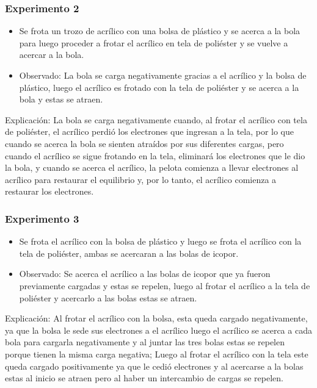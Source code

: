 \documentclass[letterpaper, 12pt]{report}
\begin{document}
\subsubsection{Experimento 2}

\begin{itemize}
	\item Se frota un  trozo de acrílico con una bolsa de plástico y se
	      acerca a la bola  para luego proceder a frotar el acrílico en tela de
	      poliéster y se vuelve a acercar a la bola.

	\item Observado: La bola se carga negativamente gracias a el acrílico
	      y la bolsa de plástico, luego el acrílico es frotado con la tela de
	      poliéster y se acerca a la bola y estas se atraen.
\end{itemize}

Explicación: La bola se carga negativamente cuando, al frotar el
acrílico con tela de poliéster, el acrílico perdió los electrones
que ingresan a la tela, por lo que cuando se acerca la bola  se
sienten atraídos por sus diferentes cargas, pero cuando el acrílico
se sigue frotando en la  tela, eliminará los electrones que le dio la bola,
y cuando se acerca el acrílico, la pelota comienza a llevar electrones al
acrílico para restaurar el equilibrio y, por lo tanto, el acrílico
comienza a restaurar los electrones.~\cite{LeyCargasElectricas}

\subsubsection{Experimento 3}

\begin{itemize}
	\item Se frota el acrílico con la bolsa de plástico y luego se frota
	      el acrílico con la tela de poliéster, ambas se acercaran a las bolas
	      de icopor.

	\item Observado: Se acerca el acrílico a las bolas de icopor que ya
	      fueron previamente cargadas y estas se repelen, luego al frotar el
	      acrílico a la tela de poliéster y acercarlo a las bolas estas se
	      atraen.
\end{itemize}

Explicación: Al frotar el acrílico con la bolsa, esta queda cargado
negativamente, ya que la bolsa le sede sus electrones a el acrílico luego el
acrílico se acerca a cada bola para cargarla negativamente y al juntar las
tres bolas estas se repelen porque tienen la misma carga negativa; Luego al
frotar el acrílico con la tela este queda cargado positivamente ya que le
cedió electrones y al acercarse a la bolas estas al inicio se atraen pero
al haber un intercambio de cargas se repelen.~\cite{LeyCargasElectricas}
\end{document}
